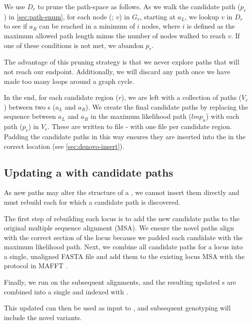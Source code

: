 We use $D_r$ to prune the path-space as follows. As we walk the candidate path ($p_r$) in \autoref{sec:path-enum}, for each node (\kmer{}; $v$) in $G_r$, starting at $a_L$, we lookup $v$ in $D_r$ to see if $a_R$ can be reached in a minimum of $i$ nodes, where $i$ is defined as the maximum allowed path length minus the number of nodes walked to reach $v$. If one of these conditions is not met, we abandon $p_r$. 

The advantage of this pruning strategy is that we never explore paths that will not reach our endpoint. Additionally, we will discard any path once we have made too many loops around a graph cycle.

\noindent
In the end, for each candidate region ($r$), we are left with a collection of paths ($V_r$) between two \kmer{}s ($a_L$ and $a_R$). We create the final candidate paths by replacing the sequence between $a_L$ and $a_R$ in the maximum likelihood path ($lmp_n$) with each path ($p_r$) in $V_r$. These are written to file - with one file per candidate region. Padding the candidate paths in this way ensures they are inserted into the \prg{} in the correct location (see \autoref{sec:denovo-insert}). 

\subsection{Updating a \panrg{} with candidate paths}
\label{sec:denovo-insert}

As new paths may alter the structure of a \prg{}, we cannot insert them directly and must rebuild each \prg{} for which a candidate path is discovered.

The first step of rebuilding each locus \prg{} is to add the new candidate paths to the original multiple sequence alignment (MSA). We ensure the novel paths align with the correct section of the locus because we padded each candidate with the maximum likelihood path. Next, we combine all candidate paths for a locus into a single, unaligned FASTA file and add them to the existing locus MSA with the  protocol in MAFFT \cite{katoh2012}. 

Finally, we run \makeprg{} on the subsequent alignments, and the resulting updated \prg{}s are combined into a single \panrg{} and indexed with \pandora{}. 

This updated \panrg{} can then be used as input to \pandora{}, and subsequent genotyping will include the novel variants.

